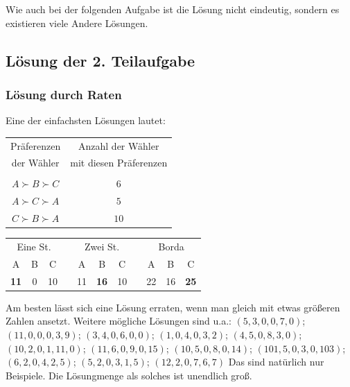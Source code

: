 \documentclass[10pt, a4paper, german]{article}
\numberwithin {equation}{section}
\begin{document}
\vspace{0.2cm} Wie auch bei der folgenden Aufgabe ist die Lösung nicht
eindeutig, sondern es existieren viele Andere Lösungen.

\subsection{Lösung der 2. Teilaufgabe}

\subsubsection{Lösung durch Raten}

Eine der einfachsten Lösungen lautet:

\begin{center}
\begin{tabular}{c|c}
Präferenzen & Anzahl der Wähler \\
der Wähler  & mit diesen Präferenzen \\
\cline{1-2}
 & \\ 
$A \succ B \succ C$ & $6$  \\
$A \succ C \succ A$ & $5$  \\
$C \succ B \succ A$ & $10$ \\
\end{tabular}

\vspace{0.5cm}
\begin{tabular}{c|c|ccc|c|ccc|c|c}
\multicolumn{3}{c}{Eine St.} & & \multicolumn{3}{c}{Zwei St.} & & \multicolumn{3}{c}{Borda} \\
A       & B & C              & &  A & B        & C            & & A  & B  & C \\
\cline{1-3} \cline{5-7} \cline{9-11} %

{\bf 11} & 0 & 10            & & 11 & {\bf 16} & 10           & & 22 & 16 & {\bf 25} \\
\end{tabular}
\end{center}

\vspace{0.2cm} Am besten lässt sich eine Lösung erraten, wenn
man gleich mit etwas größeren Zahlen ansetzt. 
Weitere mögliche Lösungen sind u.a.:
$(5,3,0,0,7,0)$; $(11,0,0,0,3,9)$; $(3,4,0,6,0,0)$;
$(1,0,4,0,3,2)$; $(4,5,0,8,3,0)$; $(10,2,0,1,11,0)$; $(11,6,0,9,0,15)$;
$(10,5,0,8,0,14)$; $(101,5,0,3,0,103)$; $(6,2,0,4,2,5)$; $(5,2,0,3,1,5)$; $(12,2,0,7,6,7)$ 
Das sind natürlich nur Beispiele. Die Lösungmenge als solches ist unendlich
groß.
\end{document}
